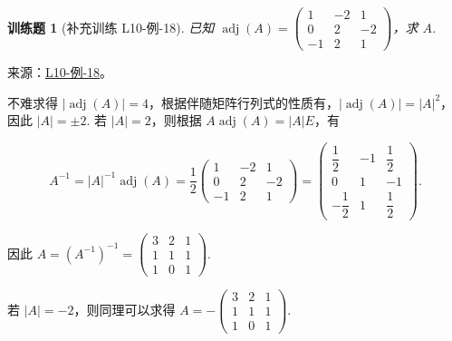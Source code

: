 \documentclass[12pt,fontset=fandol]{ctexart}
\newtheorem{exercise}{训练题}[section]
\begin{document}
\begin{exercise}[补充训练 L10-例-18]\label{prob:L10-例-18}
已知 $\operatorname{adj}(A)=\begin{pmatrix}
            1 & -2 & 1 \\ 0 & 2 & -2 \\ -1 & 2 & 1
        \end{pmatrix}$，求 $A$.
\end{exercise}
\noindent 来源：\href{https://github.com/yhwu-is/Linear-Algebra-Left-Undone/blob/new/%E8%AE%B2%E4%B9%89/%E4%B8%93%E9%A2%98/10%20%E8%A1%8C%E5%88%97%E5%BC%8F.tex}{L10-例-18}。
\begin{solve}
不难求得 $|\operatorname{adj}(A)| = 4$，根据伴随矩阵行列式的性质有，$|\operatorname{adj}(A)| = |A|^2$，因此 $|A| = \pm 2$. 若 $|A| = 2$，则根据 $A\operatorname{adj}(A) = |A|E$，有

    \[A^{-1} = |A|^{-1}\operatorname{adj}(A) = \frac{1}{2}\begin{pmatrix}
            1 & -2 & 1 \\ 0 & 2 & -2 \\ -1 & 2 & 1
        \end{pmatrix} = \begin{pmatrix}
            \dfrac{1}{2} & -1 & \dfrac{1}{2} \\ 0 & 1 & -1 \\ -\dfrac{1}{2} & 1 & \dfrac{1}{2}
        \end{pmatrix}.\]

    因此 $A = (A^{-1})^{-1} = \begin{pmatrix}
            3 & 2 & 1 \\ 1 & 1 & 1 \\ 1 & 0 & 1
        \end{pmatrix}$.

    若 $|A| = -2$，则同理可以求得 $A = -\begin{pmatrix}
            3 & 2 & 1 \\ 1 & 1 & 1 \\ 1 & 0 & 1
        \end{pmatrix}$.
\end{solve}
\end{document}
